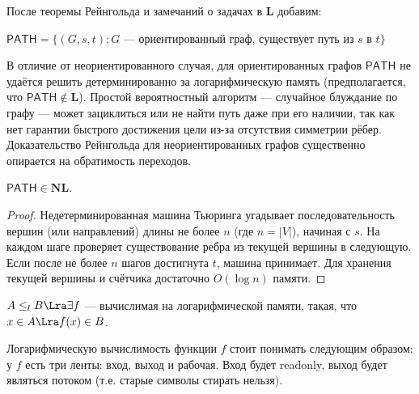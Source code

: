 После теоремы Рейнгольда и замечаний о задачах в \(\mathbf{L}\) добавим:

\begin{definition}
    \(\mathsf{PATH} = \{(G, s, t): G \text{ --- ориентированный граф, существует путь из } s \text{ в } t\}\)
\end{definition}

\begin{note}
    В отличие от неориентированного случая, для ориентированных графов \(\mathsf{PATH}\) не удаётся решить детерминированно за логарифмическую память (предполагается, что \(\mathsf{PATH} \notin \mathbf{L}\)). Простой вероятностный алгоритм — случайное блуждание по графу — может зациклиться или не найти путь даже при его наличии, так как нет гарантии быстрого достижения цели из-за отсутствия симметрии рёбер. Доказательство Рейнгольда для неориентированных графов существенно опирается на обратимость переходов.
\end{note}

\begin{proposition}
    \(\mathsf{PATH} \in \mathbf{NL}\).
\end{proposition}
\begin{proof}
    Недетерминированная машина Тьюринга угадывает последовательность вершин (или направлений) длины не более \(n\) (где \(n = |V|\)), начиная с \(s\). На каждом шаге проверяет существование ребра из текущей вершины в следующую. Если после не более \(n\) шагов достигнута \(t\), машина принимает. Для хранения текущей вершины и счётчика достаточно \(O(\log n)\) памяти.
\end{proof}

\begin{definition}
    \(A \le_l B \Lra \exists f\) --- вычислимая на логарифмической памяти, такая, что \(x \in A \Lra f(x) \in B\).
    
    Логарифмическую вычислимость функции \(f\) стоит понимать следующим образом: у \(f\) есть три ленты: вход, выход и рабочая. Вход будет readonly, выход будет являться потоком (т.е. старые символы стирать нельзя). 
\end{definition}


